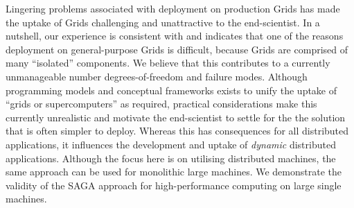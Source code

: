 \documentclass{llncs}
\begin{document}




Lingering problems associated with deployment on production Grids
has made the uptake of Grids challenging and unattractive to the end-scientist. In a
nutshell, our experience is consistent with and indicates that one of
the reasons deployment on general-purpose Grids is difficult, because
Grids are comprised of many ``isolated'' components. We believe
that this contributes to a currently unmanageable number
degrees-of-freedom and failure modes.  %
Although programming models and conceptual frameworks exists to unify the uptake of ``grids
or supercomputers'' as required, practical considerations make this
currently unrealistic and motivate the end-scientist to settle for the
the solution that is often simpler to deploy. Whereas this has
consequences for all distributed applications, it influences the
development and uptake of {\it dynamic} distributed applications.
Although the focus here is on utilising distributed
machines, the same approach can be used for monolithic large
machines. We demonstrate the validity of the SAGA approach for
high-performance computing on large single machines.
\end{document}
